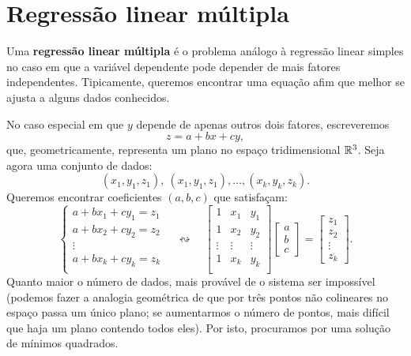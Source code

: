 \documentclass[../livro.tex]{subfiles}  %
\begin{document}
\section{Regressão linear múltipla}

Uma \textbf{regressão linear múltipla} é o problema análogo à regressão linear simples no caso em que a variável dependente pode depender de mais fatores independentes. Tipicamente, queremos encontrar uma equação afim que melhor se ajusta a alguns dados conhecidos.

No caso especial em que $y$ depende de apenas outros dois fatores, escreveremos
\[
z = a + b x + c y,
\] que, geometricamente, representa um plano no espaço tridimensional $\mathbb{R}^3$. Seja agora uma conjunto de dados:
\[
(x_1, y_1, z_1), \ (x_1, y_1, z_1), \dots, (x_k, y_k, z_k).
\] Queremos encontrar coeficientes $(a,b,c)$ que satisfaçam:
\[
\left\{
  \begin{array}{c}
    a + b x_1 + c y_1 = z_1 \\
    a + b x_2 + c y_2 = z_2 \\
    \vdots \\
    a + b x_k + c y_k = z_k \\
  \end{array}
\right. \quad \leftrightsquigarrow \quad
\begin{bmatrix}
  1 & x_1 & y_1 \\
  1 & x_2 & y_2 \\
  \vdots & \vdots & \vdots \\
  1 & x_k & y_k \\
\end{bmatrix}
\begin{bmatrix}
  a \\ b \\ c
\end{bmatrix} =
\begin{bmatrix}
  z_1 \\ z_2 \\ \vdots \\ z_k
\end{bmatrix}.
\] Quanto maior o número de dados, mais provável de o sistema ser impossível (podemos fazer a analogia geométrica de que por três pontos não colineares no espaço passa um único plano; se aumentarmos o número de pontos, mais difícil que haja um plano contendo todos eles). Por isto, procuramos por uma solução de mínimos quadrados.
\end{document}

